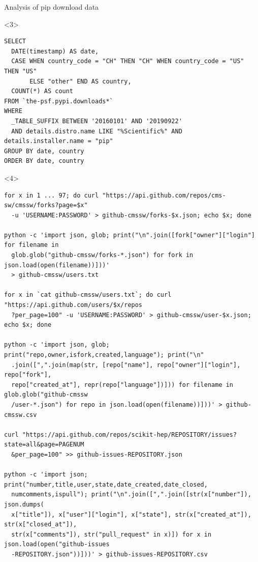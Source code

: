 \documentclass[aspectratio=169]{beamer}
\begin{document}
\begin{frame}[fragile]{Analysis of pip download data }
\begin{onlyenv}
\end{onlyenv}\begin{onlyenv}<3>
\begin{verbatim}
SELECT
  DATE(timestamp) AS date,
  CASE WHEN country_code = "CH" THEN "CH" WHEN country_code = "US" THEN "US"
       ELSE "other" END AS country,
  COUNT(*) AS count
FROM `the-psf.pypi.downloads*`
WHERE
  _TABLE_SUFFIX BETWEEN '20160101' AND '20190922'
  AND details.distro.name LIKE "%Scientific%" AND details.installer.name = "pip"
GROUP BY date, country
ORDER BY date, country
\end{verbatim}
\vspace{10 cm}
\end{onlyenv}\begin{onlyenv}<4>
\begin{verbatim}
for x in 1 ... 97; do curl "https://api.github.com/repos/cms-sw/cmssw/forks?page=$x"
  -u 'USERNAME:PASSWORD' > github-cmssw/forks-$x.json; echo $x; done

python -c 'import json, glob; print("\n".join([fork["owner"]["login"] for filename in
  glob.glob("github-cmssw/forks-*.json") for fork in json.load(open(filename))]))'
  > github-cmssw/users.txt

for x in `cat github-cmssw/users.txt`; do curl "https://api.github.com/users/$x/repos
  ?per_page=100" -u 'USERNAME:PASSWORD' > github-cmssw/user-$x.json; echo $x; done

python -c 'import json, glob; print("repo,owner,isfork,created,language"); print("\n"
  .join([",".join(map(str, [repo["name"], repo["owner"]["login"], repo["fork"],
  repo["created_at"], repr(repo["language"])])) for filename in glob.glob("github-cmssw
  /user-*.json") for repo in json.load(open(filename))]))' > github-cmssw.csv

curl "https://api.github.com/repos/scikit-hep/REPOSITORY/issues?state=all&page=PAGENUM
  &per_page=100" >> github-issues-REPOSITORY.json

python -c 'import json; print("number,title,user,state,date_created,date_closed,
  numcomments,ispull"); print("\n".join([",".join([str(x["number"]), json.dumps(
  x["title"]), x["user"]["login"], x["state"], str(x["created_at"]), str(x["closed_at"]),
  str(x["comments"]), str("pull_request" in x)]) for x in json.load(open("github-issues
  -REPOSITORY.json"))]))' > github-issues-REPOSITORY.csv 
\end{verbatim}
\vspace{10 cm}
\end{onlyenv}
\end{frame}
\end{document}
